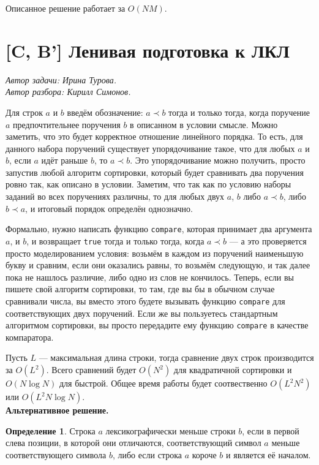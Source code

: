 \documentclass[12pt]{article}
\theoremstyle{definition}
\newtheorem*{mydef}{Определение}
\begin{document}
Описанное решение работает за $O(NM)$.

\pagebreak

\section{[C, B'] Ленивая подготовка к ЛКЛ}
\textit{Автор задачи: Ирина Турова.} \\
\textit{Автор разбора: Кирилл Симонов.}

Для строк $a$ и $b$ введём обозначение: $a \prec b$ тогда и только тогда, когда поручение $a$ предпочтительнее поручения $b$ в описанном в условии смысле.
Можно заметить, что это будет корректное отношение линейного порядка. То есть, для данного набора поручений существует упорядочивание такое, что для любых $a$ и $b$, если
$a$ идёт раньше $b$, то $a \prec b$. Это упорядочивание можно получить, просто запустив любой алгоритм сортировки, который будет сравнивать два поручения ровно так, как описано в условии.
Заметим, что так как по условию наборы заданий во всех поручениях различны, то для любых двух $a$, $b$ либо $a \prec b$, либо $b \prec a$, и итоговый порядок определён однозначно.

Формально, нужно написать функцию \verb|compare|, которая принимает два аргумента $a$, и $b$, и возвращает \verb|true| тогда и только тогда, когда $a \prec b$ --- а это проверяется
просто моделированием условия: возьмём в каждом из поручений наименьшую букву и сравним, если они оказались равны, то возьмём следующую, и так далее пока не нашлось различие, либо одно из слов не кончилось. Теперь, если вы пишете свой алгоритм сортировки, то там, где вы бы в обычном случае сравнивали числа, вы вместо этого будете вызывать функцию \verb|compare| для соответствующих двух поручений. Если же вы пользуетесь стандартным алгоритмом сортировки, вы просто передадите ему функцию \verb|compare| в качестве компаратора.

Пусть $L$ --- максимальная длина строки, тогда сравнение двух строк производится за $O(L^2)$. Всего сравнений будет $O(N^2)$ для квадратичной сортировки
и $O(N \log N)$ для быстрой. Общее время работы будет соотвественно $O(L^2N^2)$ или $O(L^2 N \log N)$. \\

\textbf{Альтернативное решение.}

\begin{mydef}
    Строка $a$ лексикографически меньше строки $b$, если в первой слева позиции, в которой они отличаются, соответствующий символ $a$ меньше соответствующего символа $b$,
    либо если строка $a$ короче $b$ и является её началом.
\end{mydef}
\end{document}
